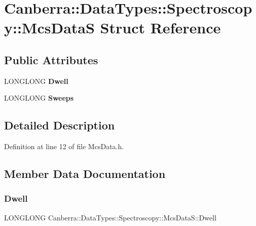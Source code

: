 \hypertarget{struct_canberra_1_1_data_types_1_1_spectroscopy_1_1_mcs_data_s}{}\section{Canberra\+:\+:Data\+Types\+:\+:Spectroscopy\+:\+:Mcs\+DataS Struct Reference}
\label{struct_canberra_1_1_data_types_1_1_spectroscopy_1_1_mcs_data_s}
\subsection*{Public Attributes}
\begin{DoxyCompactItemize}
\item 
\mbox{\label{struct_canberra_1_1_data_types_1_1_spectroscopy_1_1_mcs_data_s_a028cba779f5a5a694c86bc1588fd82e2}} 
L\+O\+N\+G\+L\+O\+NG {\bfseries Dwell}
\item 
\mbox{\label{struct_canberra_1_1_data_types_1_1_spectroscopy_1_1_mcs_data_s_a7e4a45274d6a6bb3ecce1e4be6f8e483}} 
L\+O\+N\+G\+L\+O\+NG {\bfseries Sweeps}
\end{DoxyCompactItemize}


\subsection{Detailed Description}


Definition at line 12 of file Mcs\+Data.\+h.



\subsection{Member Data Documentation}
\mbox{\label{struct_canberra_1_1_data_types_1_1_spectroscopy_1_1_mcs_data_s_a028cba779f5a5a694c86bc1588fd82e2}} 
\subsubsection{\texorpdfstring{Dwell}{Dwell}}
{\footnotesize\ttfamily L\+O\+N\+G\+L\+O\+NG Canberra\+::\+Data\+Types\+::\+Spectroscopy\+::\+Mcs\+Data\+S\+::\+Dwell}



